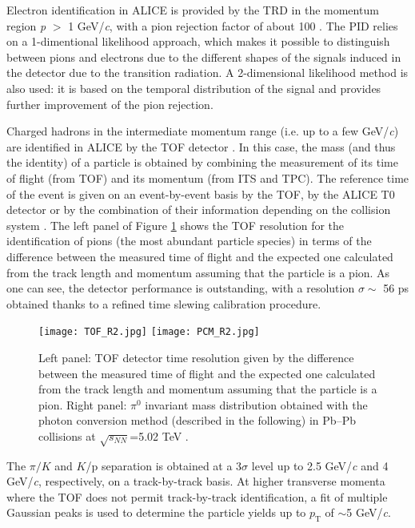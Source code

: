 \documentclass[10pt]{article}
\begin{document}
Electron identification in ALICE is provided by the TRD in the momentum region {\it p} $>$ 1 GeV/{\it c}, with a pion rejection factor of about 100 \cite{ref:perf}. The PID relies on a 1-dimentional likelihood approach, which makes it possible to distinguish between pions and electrons due to the different shapes of the signals induced in the detector due to the transition radiation. A 2-dimensional likelihood method is also used: it is based on the temporal distribution of the signal and provides further improvement of the pion rejection.  

Charged hadrons in the intermediate momentum range (i.e. up to a few GeV/{\it c}) are identified in ALICE by the TOF detector \cite{ref:perf}. In this case, the mass (and thus the identity) of a particle is obtained by combining the measurement of its time of flight (from TOF) and its momentum (from ITS and TPC). The reference time of the event is given on an event-by-event basis by the TOF, by the ALICE T0 detector or by the combination of their information depending on the collision system \cite{ref:tof}.
The left panel of Figure \ref{fig:fig4} shows the TOF resolution for the identification of pions (the most abundant particle species) in terms of the difference between the measured time of flight and the expected one calculated from the track length and momentum assuming that the particle is a pion. As one can see, the detector performance is outstanding, with a resolution $\sigma\sim$ 56 ps obtained thanks to a refined time slewing calibration procedure.
\begin{figure}[h]
\centering
\texttt{[image: TOF\_R2.jpg]}
\hspace{2mm}
\texttt{[image: PCM\_R2.jpg]}
\caption{Left panel: TOF detector time resolution given by the difference between the measured time of flight and the expected one calculated from the track length and momentum assuming that the particle is a pion. 
Right panel: $\pi^{0}$ invariant mass distribution obtained with the photon conversion method (described in the following) in Pb--Pb collisions at $\sqrt{s_{NN}}$=5.02 TeV .
}
\label{fig:fig4}
\end{figure}
The $\pi/K$ and $K$/p separation is obtained at a $3 \sigma$ level up to 2.5 GeV/{\it c} and 4 GeV/{\it c}, respectively, on a track-by-track basis. At higher transverse momenta where the TOF does not permit track-by-track identification, a fit of multiple Gaussian peaks is used to determine the particle yields up to $p_{\mathrm{T}}$ of $\sim$5 GeV/{\it c}.
\end{document}
